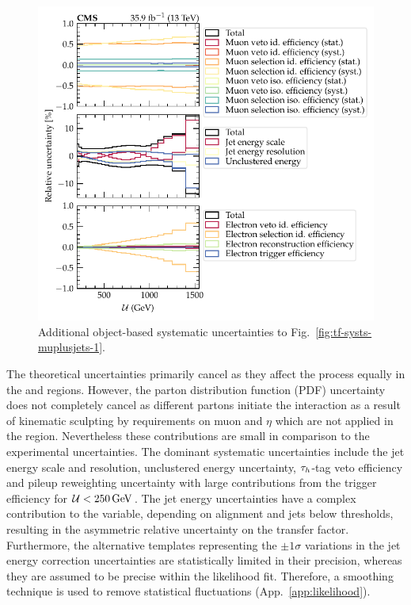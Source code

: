 %
\begin{figure}
    \centering
    \includegraphics{chapters/042_backgrounds/images/tf_wj_mu_met_systs2.pdf}
    \caption[Object-based uncertainties on the transfer factors]{
        Additional object-based systematic uncertainties to Fig.~\ref{fig:tf-systs-muplusjets-1}.
    }
    \label{fig:tf-systs-muplusjets-2}
\end{figure}
%
The theoretical uncertainties primarily cancel as they affect the \IWj process equally in the \metplusjets and \muplusjets regions. However, the parton distribution function (PDF) uncertainty does not completely cancel as different partons initiate the interaction as a result of kinematic sculpting by requirements on muon \pt and $\eta$ which are not applied in the \metplusjets region. Nevertheless these contributions are small in comparison to the experimental uncertainties. The dominant systematic uncertainties include the jet energy scale and resolution, unclustered energy uncertainty, $\tau_h$-tag veto efficiency and pileup reweighting uncertainty with large contributions from the \ptmiss trigger efficiency for ${\mathcal{U}<\SI{250}{GeV}}$. The jet energy uncertainties have a complex contribution to the \recoil variable, depending on alignment and jets below thresholds, resulting in the asymmetric relative uncertainty on the transfer factor. Furthermore, the alternative templates representing the $\pm 1\sigma$ variations in the jet energy correction uncertainties are statistically limited in their precision, whereas they are assumed to be precise within the likelihood fit. Therefore, a smoothing technique is used to remove statistical fluctuations (App.~\ref{app:likelihood}).

